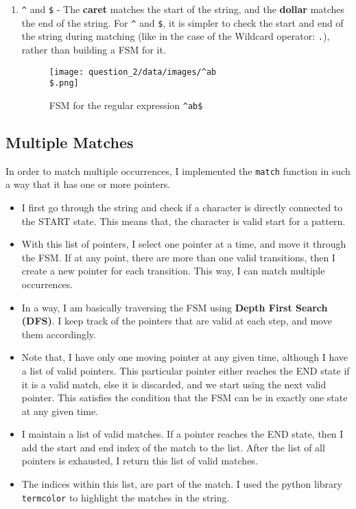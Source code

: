 \documentclass[12pt]{report}
\begin{document}
\begin{enumerate}
    \item \texttt{\^} and \texttt{\$} - The \textbf{caret} matches the start of the string, and the \textbf{dollar} matches the end of the string.
          For \texttt{\textasciicircum} and \texttt{\$}, it is simpler to check the start and end of the string during matching (like in the case of the Wildcard operator:  \texttt{.}), rather than building a FSM for it.

          \begin{figure}[H]
              \centering
              \texttt{[image: question\_2/data/images/^ab\\\$.png]}
              \caption{FSM for the regular expression \texttt{\textasciicircum ab\$}}
          \end{figure}

\end{enumerate}

\subsection{Multiple Matches}

In order to match multiple occurrences, I implemented the \texttt{match} function in such a way that it has one or more pointers.

\begin{itemize}
    \item I first go through the string and check if a character is directly connected to the START state. This means that, the character is valid start for a pattern.
    \item With this list of pointers, I select one pointer at a time, and move it through the FSM. If at any point, there are more than one valid transitions, then I create a new pointer for each transition. This way, I can match multiple occurrences.
    \item In a way, I am basically traversing the FSM using \textbf{Depth First Search (DFS)}. I keep track of the pointers that are valid at each step, and move them accordingly.
    \item Note that, I have only one moving pointer at any given time, although I have a list of valid pointers. This particular pointer either reaches the END state if it is a valid match, else it is discarded, and we start using the next valid pointer. This satisfies the condition that the FSM can be in exactly one state at any given time.
    \item I maintain a list of valid matches. If a pointer reaches the END state, then I add the start and end index of the match to the list. After the list of all pointers is exhausted, I return this list of valid matches.
    \item The indices within this list, are part of the match. I used the python library \texttt{termcolor} to highlight the matches in the string.
\end{itemize}
\end{document}
